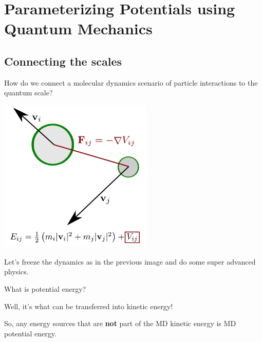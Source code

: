\documentclass[
paper=128mm:96mm, %
fontsize=11pt, %
pagesize, %
parskip=half-, %
]{scrartcl} %
\theoremstyle{mythmstyle} %
\begin{document}
\clearpage


\section{Parameterizing Potentials using Quantum Mechanics}


\clearpage


\subsection{Connecting the scales}

How do we connect a molecular dynamics scenario of particle interactions to the quantum scale?

\clearpage


\begin{center}
\includegraphics[width=0.55\textwidth]{moleculesColliding.pdf}
\end{center}

\clearpage


Let's freeze the dynamics as in the previous image and do some super advanced physics.
\clearpage


What is potential energy?
\clearpage

Well, it's what can be transferred into kinetic energy!
\clearpage

So, any energy sources that are \textbf{not} part of the MD kinetic energy is MD potential energy.
\clearpage
\end{document}
